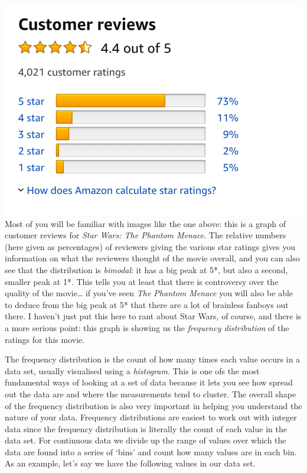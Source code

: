 \documentclass[
]{book}
\begin{document}
\includegraphics{Images/Phantom_menace_Amazon.png}
Most of you will be familiar with images like the one above: this is a graph of customer reviews for \emph{Star Wars: The Phantom Menace}. The relative numbers (here given as percentages) of reviewers giving the various star ratings gives you information on what the reviewers thought of the movie overall, and you can also see that the distribution is \emph{bimodal}: it has a big peak at 5*, but also a second, smaller peak at 1*. This tells you at least that there is controversy over the quality of the movie\ldots{} if you've seen \emph{The Phantom Menace} you will also be able to deduce from the big peak at 5* that there are a lot of brainless fanboys out there. I haven't just put this here to rant about Star Wars, of course, and there is a more serious point: this graph is showing us the \emph{frequency distribution} of the ratings for this movie.

The frequency distribution is the count of how many times each value occurs in a data set, usually visualised using a \emph{histogram}. This is one ofs the most fundamental ways of looking at a set of data because it lets you see how spread out the data are and where the measurements tend to cluster. The overall shape of the frequency distribution is also very important in helping you understand the nature of your data. Frequency distributions are easiest to work out with integer data since the frequency distribution is literally the count of each value in the data set. For continuous data we divide up the range of values over which the data are found into a series of `bins' and count how many values are in each bin. As an example, let's say we have the following values in our data set.
\end{document}
